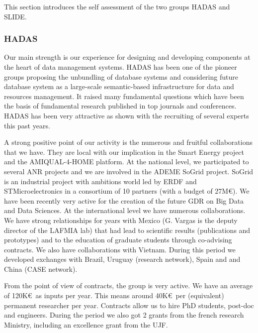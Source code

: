 This section introduces the self assessment of the two groups HADAS and SLIDE.

\subsubsection*{HADAS}

Our main strength is our experience for designing and developing components at the heart of data management systems. HADAS has been one of the pioneer groups proposing the unbundling of database systems and considering future database system as a large-scale semantic-based infrastructure for data and resources management. It raised many fundamental questions  which have been the basis of fundamental research published in top journals and conferences. HADAS has been very attractive as shown with the recruiting of several experts this past years. 


A strong positive point of our activity is the numerous and fruitful collaborations that we have. They  are local with our  implication in the Smart Energy project and the AMIQUAL-4-HOME platform.  At the national level, we participated to several ANR projects and we are involved in the ADEME SoGrid project. SoGrid is an industrial project with ambitions world led by ERDF and STMicroelectronics in a consortium of 10 partners (with a budget of 27M\euro ). We have been recently very active for the creation of the future GDR on Big Data and Data Sciences. 
At the international level we have numerous  collaborations.  We have strong relationships for years with Mexico (G. Vargas is the deputy director of the LAFMIA lab) that had lead to scientific results (publications and prototypes) and to the education of graduate students through co-advising contracts. We also have collaborations with Vietnam. During this period we developed exchanges with Brazil, Uruguay (research network), Spain and and China (CASE network).  

From the point of view of contracts, the group is very active. We have an average of 120K\euro\ as inputs per year. This means around 40K\euro\ per (equivalent) permanent researcher per year. Contracts allow us to hire PhD students, post-doc and engineers. During the period we also got 2 grants from the french research Ministry, including an excellence grant from the UJF. 

